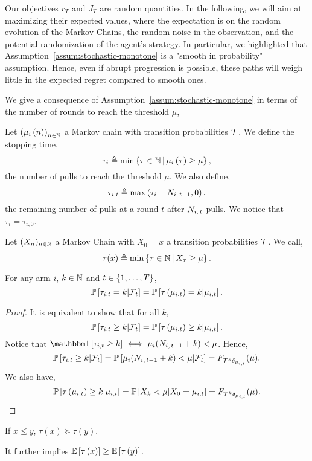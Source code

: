 \begin{remark}
Our objectives $r_T$ and $J_T$ are random quantities. In the following, we will aim at maximizing their expected values, where the expectation is on the random evolution of the Markov Chains, the random noise in the observation, and the potential randomization of the agent's strategy. In particular, we highlighted that Assumption~\ref{assum:stochastic-monotone} is a "smooth in probability" assumption. Hence, even if abrupt progression is possible, these paths will weigh little in the expected regret compared to smooth ones.
\end{remark}
We give a consequence of Assumption~\ref{assum:stochastic-monotone} in terms of the number of rounds to reach the threshold $\mu$,

\begin{definition}
Let $\left(\mu_i\left(n\right)\right)_{ n \in {\mathbb N}}$ a Markov chain with transition probabilities $\mathcal{T}$. We define the stopping time,
\[
\tau_{i}  \triangleq \min\left\{\tau \in {\mathbb N} \, | \, \mu_i\left(\tau\right) \geq \mu \right\},
\]
the number of pulls to reach the threshold $\mu$. We also define, 
\[
\tau_{i,t}  \triangleq \max\left(\tau_{i} - N_{i,\,t-1}, 0\right).
\]
the remaining number of pulls at a round $t$ after $N_{i,\,t}$ pulls. We notice that $\tau_{i} = \tau_{i,0}$.

Let $(X_n)_{n\in {\mathbb N}}$ a Markov Chain with $X_0=x$ a transition probabilities $\mathcal{T}$. We call, 
\[
\tau(x) \triangleq \min\left\{\tau \in {\mathbb N} \, | \, X_\tau \geq \mu \right\}.
\]
\end{definition}
\begin{lemma}
\label{lem:taux-taui}
For any arm $i$, $k\in {\mathbb N}$ and $t\in \left\{1, \dots, T\right\}$, 
\[\mathbb{P}\left[\tau_{i,t} = k| \mathcal{F}_t\right] =  \mathbb{P}\left[\tau\left(\mu_{i,t}\right)=k|\mu_{i,t}\right].\]
\end{lemma}
\begin{proof}
It is equivalent to show that for all $k$, 
\[\mathbb{P}\left[\tau_{i,t} \geq k| \mathcal{F}_t\right] =  \mathbb{P}\left[\tau\left(\mu_{i,t}\right)\geq k|\mu_{i,t}\right].\]
Notice that $\ind{\tau_{i,t} \geq k} \iff \mu_i(\Nitmone +k)< \mu $. Hence, 
\[\mathbb{P}\left[\tau_{i,t} \geq k| \mathcal{F}_t\right]  = \mathbb{P}\left[\mu_i(N_{i,\,t-1} +k)< \mu| \mathcal{F}_t\right] = F_{\mathcal{T}^k\delta_{\mu_{i,t}}}(\mu)  .
\]
We also have, 
\[ \mathbb{P}\left[\tau\left(\mu_{i,t}\right)\geq k|\mu_{i,t}\right]= \mathbb{P}\left[X_k <\mu | X_0 = \mu_{i,t}\right] = F_{\mathcal{T}^k\delta_{\mu_{i,t}}}(\mu).  \]
\end{proof}
\begin{lemma}
\label{lem:stopping-time}
If $x \leq y$, $\tau(x) \succeq \tau(y)$.

It further implies $\mathbb{E}\left[\tau\left(x\right)\right] \geq \mathbb{E}\left[\tau\left(y\right)\right]$.
\end{lemma}
